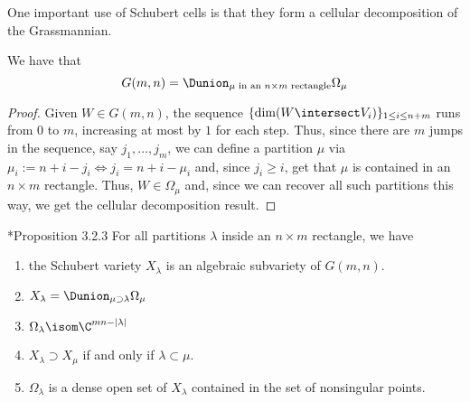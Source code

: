 \documentclass[11pt,leqno,oneside]{amsart}
\numberwithin{thm}{section}
\begin{document}
One important use of Schubert cells is that they form a cellular
decomposition of the Grassmannian.
\begin{lem}
  We have that \[
    G(m,n) = \Dunion_{\mu \text{ in an }n \times m \text{ rectangle}}
    \Omega_\mu 
  \]
\end{lem}
\begin{proof}
  Given \(W \in G(m,n)\), the sequence \(\{\dim(W \intersect V_i)\}_{1
  \leq i \leq n+m}\) runs from \(0\) to \(m\), increasing at most by
\(1\) for each step. Thus, since there are \(m\) jumps in the
sequence, say \(j_1, \ldots, j_m\), we can define a partition \(\mu\)
via \(\mu_i := n+i-j_i \iff j_i = n+i-\mu_i\) and, since \(j_i \geq
i\), get that \(\mu\) is contained in an \(n \times m\)
rectangle. Thus, \(W \in \Omega_\mu\) and, since we can recover all
such partitions this way, we get the cellular decomposition result.
\end{proof}
\begin{prop}
  \cite{manivel}*{Proposition 3.2.3} For all partitions \(\lambda\)
  inside an \(n 
  \times m\) rectangle, we have
  \begin{enumerate}
  \item the Schubert variety \(X_\lambda\) is an algebraic subvariety
    of \(G(m,n)\).
  \item \(X_\lambda = \Dunion_{\mu \supset
      \lambda} \Omega_\mu\)
  \item \(\Omega_\lambda \isom \C^{mn-|\lambda|}\)
  \item \(X_\lambda \supset X_\mu\) if and only if \(\lambda \subset
    \mu\).
  \item \(\Omega_\lambda\) is a dense open set of \(X_\lambda\)
    contained in the set of nonsingular points.
  \end{enumerate}
\end{prop}
\end{document}

